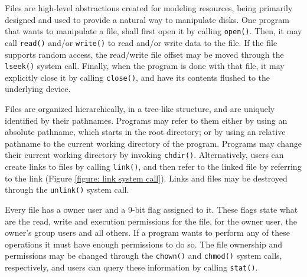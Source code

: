 \documentclass[10pt,a4paper]{article}
\begin{document}
Files are high-level abstractions created for modeling resources, being primarily designed and used to provide a natural way to manipulate disks. One program that wants to manipulate a file, shall first open it by calling \texttt{open()}. Then, it may call \texttt{read()} and/or \texttt{write()} to read and/or write data to the file. If the file supports random access, the read/write file offset may be moved through the \texttt{lseek()} system call. Finally, when the program is done with that file, it may explicitly close it by calling \texttt{close()}, and have its contents flushed to the underlying device.

Files are organized hierarchically, in a tree-like structure, and are uniquely identified by their pathnames. Programs may refer to them either by using an absolute pathname, which starts in the root directory; or by using an relative pathname to the current working directory of the program. Programs may change their current working directory by invoking \texttt{chdir()}. Alternatively, users can create links to files by calling \texttt{link()}, and then refer to the linked file by referring to the link (Figure \ref{figure: link system call}). Links and files may be destroyed through the \texttt{unlink()} system call.

Every file has a owner user and a 9-bit flag assigned to it. These flags state what are the read, write and execution permissions for the file, for the owner user, the owner's group users and all others. If a program wants to perform any of these operations it must have enough permissions to do so. The file ownership and permissions may be changed through the \texttt{chown()} and \texttt{chmod()} system calls, respectively, and users can query these information by calling \texttt{stat()}.
\end{document}
